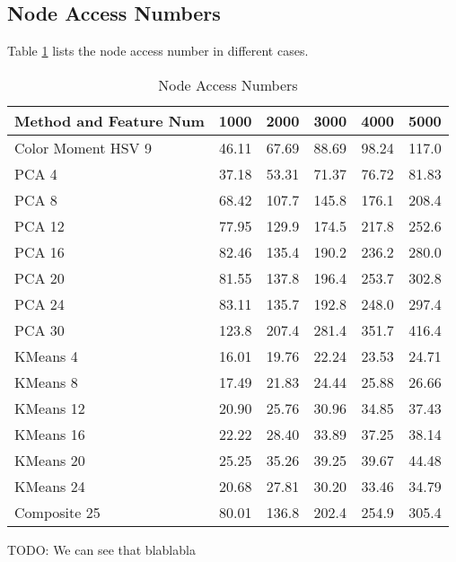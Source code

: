 \documentclass{acm_proc_article-sp}
\begin{document}
\subsection{Node Access Numbers}
Table \ref{table:accessnum} lists the node access number in different cases.
\begin{table} \centering 
    \caption{Node Access Numbers}
    \label{table:accessnum}
\begin{tabular}{|p{2.1cm}|c|c|c|c|c|}
    \hline
    Method and Feature Num & 1000 & 2000 & 3000 & 4000 & 5000 \\ \hline
    Color Moment HSV 9 & 46.11 & 67.69 & 88.69 & 98.24 & 117.0 \\ \hline
    PCA 4 & 37.18 & 53.31 & 71.37 & 76.72 & 81.83 \\ \hline
    PCA 8 & 68.42 & 107.7 & 145.8 & 176.1 & 208.4 \\ \hline
    PCA 12 & 77.95 & 129.9 & 174.5 & 217.8 & 252.6 \\ \hline
    PCA 16 & 82.46 & 135.4 & 190.2 & 236.2 & 280.0 \\ \hline
    PCA 20 & 81.55 & 137.8 & 196.4 & 253.7 & 302.8 \\ \hline
    PCA 24 & 83.11 & 135.7 & 192.8 & 248.0 & 297.4 \\ \hline
    PCA 30 & 123.8 & 207.4 & 281.4 & 351.7 & 416.4 \\ \hline
    KMeans 4 & 16.01 & 19.76 & 22.24 & 23.53 & 24.71 \\ \hline
    KMeans 8 & 17.49 & 21.83 & 24.44 & 25.88 & 26.66 \\ \hline
    KMeans 12 & 20.90 & 25.76 & 30.96 & 34.85 & 37.43 \\ \hline
    KMeans 16 & 22.22 & 28.40 & 33.89 & 37.25 & 38.14 \\ \hline
    KMeans 20 & 25.25 & 35.26 & 39.25 & 39.67 & 44.48 \\ \hline
    KMeans 24 & 20.68 & 27.81 & 30.20 & 33.46 & 34.79 \\ \hline
    Composite 25 & 80.01 & 136.8 & 202.4 & 254.9 & 305.4 \\ \hline
\end{tabular} \end{table}

TODO: We can see that blablabla
\end{document}
